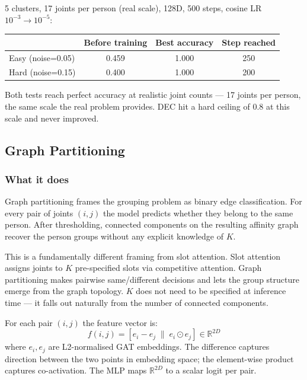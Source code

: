 5 clusters, 17 joints per person (real scale), 128D, 500 steps, cosine LR $10^{-3} \to 10^{-5}$:

\begin{center}
\begin{tabular}{lccc}
\toprule
 & Before training & Best accuracy & Step reached \\
\midrule
Easy (noise=0.05) & 0.459 & 1.000 & 250 \\
Hard (noise=0.15) & 0.400 & 1.000 & 200 \\
\bottomrule
\end{tabular}
\end{center}

Both tests reach perfect accuracy at realistic joint counts --- 17 joints per person, the same scale the real problem provides. DEC hit a hard ceiling of 0.8 at this scale and never improved.


\subsection{Graph Partitioning}

\subsubsection{What it does}

Graph partitioning frames the grouping problem as binary edge classification. For every pair of joints $(i, j)$ the model predicts whether they belong to the same person. After thresholding, connected components on the resulting affinity graph recover the person groups without any explicit knowledge of $K$.

This is a fundamentally different framing from slot attention. Slot attention assigns joints to $K$ pre-specified slots via competitive attention. Graph partitioning makes pairwise same/different decisions and lets the group structure emerge from the graph topology. $K$ does not need to be specified at inference time --- it falls out naturally from the number of connected components.

For each pair $(i, j)$ the feature vector is:
\begin{equation}
f(i, j) = [e_i - e_j \; \| \; e_i \odot e_j] \in \mathbb{R}^{2D}
\end{equation}
where $e_i, e_j$ are L2-normalised GAT embeddings. The difference captures direction between the two points in embedding space; the element-wise product captures co-activation. The MLP maps $\mathbb{R}^{2D}$ to a scalar logit per pair.

